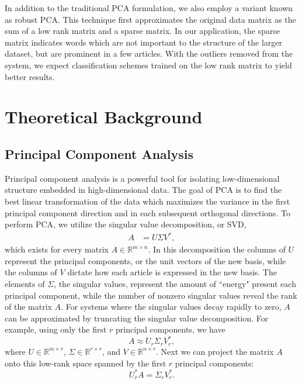 \documentclass[12pt]{article}
\newcommand{\R}{\mathbb{R}}
\begin{document}
In addition to the traditional PCA formulation, we also employ a variant known as robust PCA. This technique first approximates the original data matrix as the sum of a low rank matrix and a sparse matrix. In our application, the sparse matrix indicates words which are not important to the structure of the larger dataset, but are prominent in a few articles. With the outliers removed from the system, we expect classification schemes trained on the low rank matrix to yield better results. 

\section{Theoretical Background}

\subsection{Principal Component Analysis
}
Principal component analysis is a powerful tool for isolating low-dimensional
structure embedded in high-dimensional data. The goal of PCA is to find the best
linear transformation of the data which maximizes the variance in the first principal component direction and in each subsequent orthogonal directions. To perform PCA, we utilize the singular value decomposition, or SVD, 
\begin{align} 
A &= U \Sigma V^*,
\label{eq:svd}
\end{align}
which exists for every matrix $A \in \R^{m \times n}.$ In this decomposition the columns of $U$ represent the principal components, or the unit vectors of the new basis, while the columns of $V$ dictate how each article is expressed in the new basis. The elements of $\Sigma$, the singular values, represent the amount of ``energy" present each principal component, while the number of nonzero singular values reveal the rank of the matrix $A$. For systems where the singular values decay rapidly to zero, $A$ can be approximated by truncating the singular value decomposition. For example, using only the first $r$ principal components, we have
\begin{equation}
A \approx U_r \Sigma_r V_r^*,
\end{equation}
where $U \in \R^{m \times r}$, $\Sigma \in \R^{r \times r}$, and $V \in \R^{n \times r}$. Next we can project the matrix $A$ onto this low-rank space spanned by the first $r$ principal components:
\begin{equation}
U_r^* A = \Sigma_r V_r^*.
\end{equation}
\end{document}
